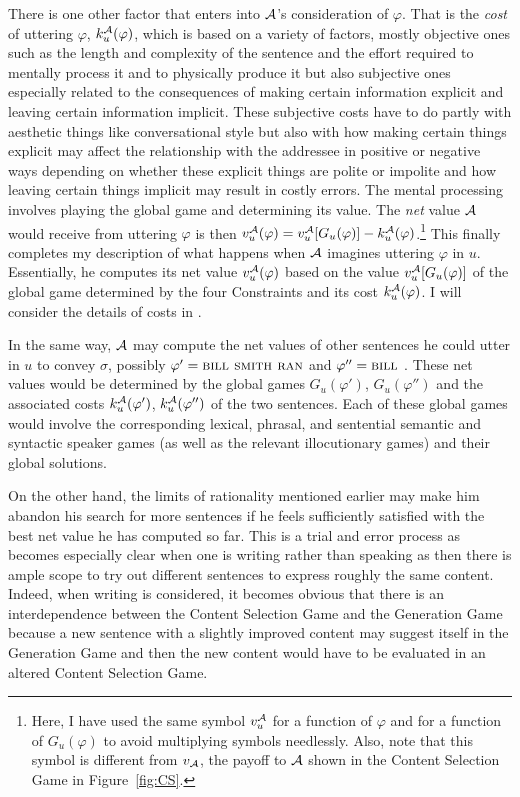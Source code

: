 There is one other factor that enters into $\cal A$'s consideration of $\varphi$. That is the \emph{cost} of uttering $\varphi$, $k^{\cal A}_u(\varphi)$, which is based on a variety of factors, mostly objective ones such as the length and complexity of the sentence and the effort required to mentally process it and to physically produce it but also subjective ones especially related to the consequences of making certain information explicit and leaving certain information implicit. These subjective costs have to do partly with aesthetic things like conversational style but also with how making certain things explicit may affect the relationship with the addressee in positive or negative ways depending on whether these explicit things are polite or impolite and how leaving certain things implicit may result in costly errors. The mental processing involves playing the global game and determining its value. The \emph{net} value $\cal A$ would receive from uttering $\varphi$ is then $v_u^{\cal A}(\varphi) = v_u^{\cal A}[G_u(\varphi)] - k^{\cal A}_u(\varphi)$.\footnote{Here, I have used the same symbol $v_u^{\cal A}$ for a function of $\varphi$ and for a function of $G_u(\varphi)$ to avoid multiplying symbols needlessly. Also, note that this symbol is different from $v_{\cal A}$, the payoff to $\cal A$ shown in the Content Selection Game in Figure~\ref{fig:CS}.} This finally completes my description of what happens when $\cal A$ imagines uttering $\varphi$ in $u$. Essentially, he computes its net value $v_u^{\cal A}(\varphi)$ based on the value $v_u^{\cal A}[G_u(\varphi)]$ of the global game determined by the four Constraints and its cost $k^{\cal A}_u(\varphi)$. I will consider the details of costs in .

In the same way, $\cal A$ may compute the net values of other sentences he could utter in $u$ to convey $\sigma$, possibly 
$\varphi' = \Expression{Bill Smith ran}$ and $\varphi'' = \Expression{Bill}$ . These net values would be determined by the global games $G_u(\varphi')$, $G_u(\varphi'')$ and the associated costs $k^{\cal A}_u(\varphi')$, $k^{\cal A}_u(\varphi'')$ of the two sentences. Each of these global games would involve the corresponding lexical, phrasal, and sentential semantic and syntactic speaker games (as well as the relevant illocutionary games) and their global solutions. 

On the other hand, the limits of rationality mentioned earlier may make him abandon his search for more sentences if he feels sufficiently satisfied with the best net value he has computed so far. This is a trial and error process as becomes especially clear when one is writing rather than speaking as then there is ample scope to try out different sentences to express roughly the same content. Indeed, when writing is considered, it becomes obvious that there is an interdependence between the Content Selection Game and the Generation Game because a new sentence with a slightly improved content may suggest itself in the Generation Game and then the new content would have to be evaluated in an altered Content Selection Game.

